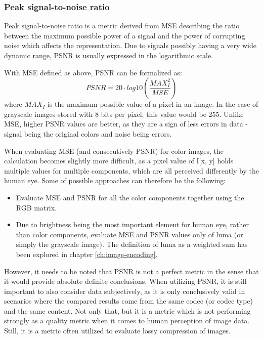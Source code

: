 \documentclass[thesis=M,english]{FITthesis}[2012/10/20]
\begin{document}
\subsubsection{Peak signal-to-noise ratio}
Peak signal-to-noise ratio is a metric derived from MSE describing the ratio
between the maximum possible power of a signal and the power of corrupting
noise which affects the representation. Due to signals possibly having
a very wide dynamic range, PSNR is usually expressed in the logarithmic scale.

With MSE defined as above, PSNR can be formalized as:
\begin{equation}
    PSNR = 20 \cdot log10 \left( \frac{MAX^2_I}{MSE} \right)
\end{equation}
where $MAX_I$ is the maximum possible value of a pixel in an image. In the
case of grayscale images stored with 8 bits per pixel, this value would
be 255. Unlike MSE, higher PSNR values are better, as they are a sign of less errors
in data - signal being the original colors and noise being errors.

When evaluating MSE (and consecutively PSNR) for color images, the calculation becomes
slightly more difficult, as a pixel value of I[x, y] holds multiple values for multiple
components, which are all perceived differently by the human eye. Some of possible approaches
can therefore be the following:
\begin{itemize}
  \item Evaluate MSE and PSNR for all the color components together using the RGB matrix.
  \item Due to brightness being the most important element for human eye, rather than
  color components, evaluate MSE and PSNR values only of luma (or simply the grayscale
  image). The definition of luma as a weighted sum has been explored in chapter \ref{ch:image-encoding}.
\end{itemize}
\cite{matlab18}\cite{netpbm}


However, it needs to be noted that PSNR is not a perfect metric in the sense
that it would provide absolute definite conclusions. When utilizing PSNR, it is
still important to also consider data subjectively, as it is only conclusively
valid in scenarios where the compared results come from the same codec (or codec
type) and the same content. Not only that, but it is a metric which is not
performing strongly as a quality metric when it comes to human perception
of image data.\cite{psnrvalid} Still, it is a metric often
utilized to evaluate lossy compression
of images.
\end{document}
